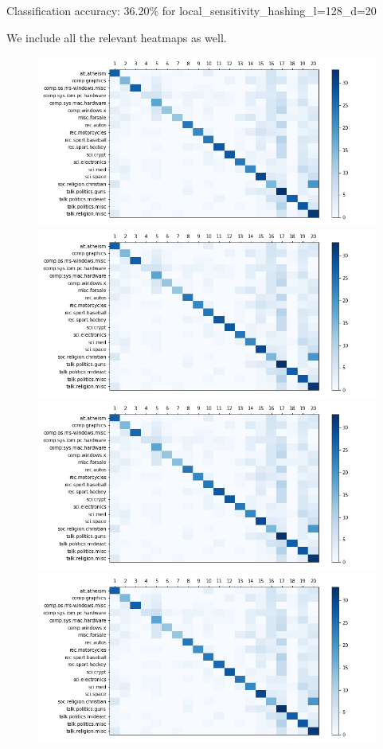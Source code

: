 \documentclass[12pt]{article}
\begin{document}
\begin{enumerate}[label=(\alph*)]
    Classification accuracy: 36.20\% for local\_sensitivity\_hashing\_l=128\_d=20


    We include all the relevant heatmaps as well.
    \begin{figure}[!ht]
      \includegraphics[scale=0.2]{figures/local_sensitivity_hashing_l=128_d=5.png}
      \includegraphics[scale=0.2]{figures/local_sensitivity_hashing_l=128_d=6.png}
      \includegraphics[scale=0.2]{figures/local_sensitivity_hashing_l=128_d=7.png}
      \includegraphics[scale=0.2]{figures/local_sensitivity_hashing_l=128_d=8.png}

\end{figure}
\end{enumerate}
\end{document}
